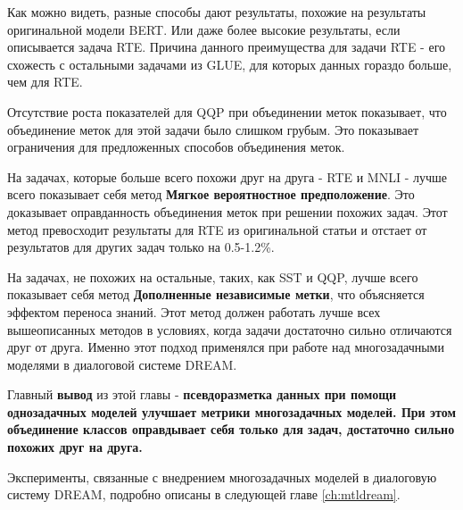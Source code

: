 Как можно видеть, разные способы дают результаты, похожие на результаты оригинальной модели BERT. Или даже более высокие результаты, если описывается задача RTE. Причина данного преимущества для задачи RTE -  его схожесть с остальными задачами из GLUE, для которых данных гораздо больше, чем для RTE.

 Отсутствие роста показателей для QQP при объединении меток показывает, что объединение меток для этой задачи было слишком грубым. Это показывает ограничения для предложенных способов объединения меток.
 
На задачах, которые больше всего похожи друг на друга - RTE и MNLI - лучше всего показывает себя метод \textbf{Мягкое вероятностное предположение}. Это доказывает оправданность объединения меток при решении похожих задач. Этот метод превосходит результаты для RTE из оригинальной статьи и отстает от результатов для других задач только на 0.5-1.2\%.

На задачах, не похожих на остальные, таких, как SST и QQP, лучше всего показывает себя метод \textbf{Дополненные независимые метки}, что объясняется эффектом переноса знаний. Этот метод должен работать лучше всех вышеописанных методов в условиях, когда задачи достаточно сильно отличаются друг от друга. Именно этот подход применялся при работе над многозадачными моделями в диалоговой системе DREAM.

Главный \textbf{вывод} из этой главы - \textbf{псевдоразметка данных при помощи однозадачных моделей улучшает метрики многозадачных моделей. При этом объединение классов оправдывает себя только для задач, достаточно сильно похожих друг на друга.}

Эксперименты, связанные с внедрением многозадачных моделей в диалоговую систему DREAM, подробно описаны в следующей главе \ref{ch:mtldream}.
